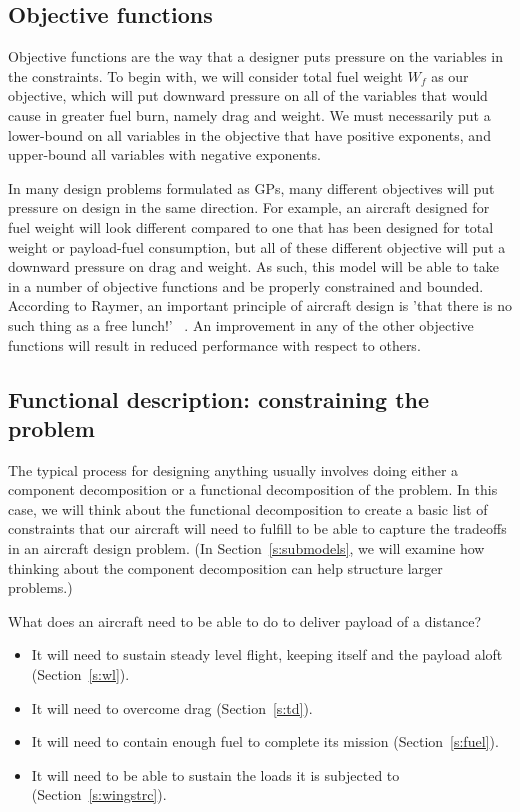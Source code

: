 \subsection{Objective functions}
\label{s:objective}

Objective functions are the way that a designer puts pressure on the variables 
in the constraints. To begin with, we will consider
total fuel weight $W_f$ as our objective, which will put
downward pressure on all of the variables that would cause in greater fuel burn, namely
drag and weight. We must necessarily put a lower-bound on all variables in the objective
that have positive exponents, and upper-bound all variables with negative exponents.

In many design problems
formulated as \gls{GP}s, many different objectives will put pressure on design
in the same direction. For example, an aircraft designed for fuel weight will look
different compared to one
that has been designed for total weight or payload-fuel consumption, but all of
these different objective will put a downward pressure on drag and weight.
As such, this model will be able to take in a number of objective functions
and be properly constrained and bounded. According to Raymer, an important
principle of aircraft design is 'that there is no such thing as a free lunch!'
~\cite[pg.26]{raymer}. An improvement in any of the other objective functions
will result in reduced performance with respect to others.

\subsection{Functional description: constraining the problem}

The typical process for designing anything usually involves doing either a
component decomposition or a functional decomposition of the problem. In
this case, we will think about the functional decomposition to create a
basic list of constraints that our aircraft will need to fulfill to be
able to capture the tradeoffs in an aircraft design problem. (In
Section~\ref{s:submodels}, we will examine how thinking about the component decomposition
can help structure larger problems.)

What does an aircraft need to be able to do to deliver payload of a distance?
\begin{itemize}
	\item It will need to sustain steady
    level flight, keeping itself and the payload aloft (Section~\ref{s:wl}).
    \item It will need to overcome drag (Section~\ref{s:td}).
	\item It will need to contain enough fuel to complete its mission
        (Section~\ref{s:fuel}).
	\item It will need to be able to sustain the loads it is
    subjected to (Section~\ref{s:wingstrc}).
\end{itemize}

